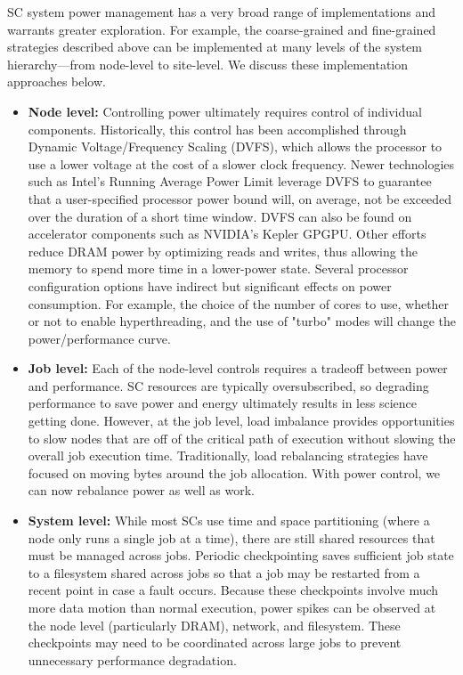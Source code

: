 SC system power management has a very broad range of implementations and warrants greater exploration. For example, the coarse-grained and fine-grained strategies described above can be implemented at many levels of the system hierarchy---from node-level to site-level. We discuss these implementation approaches below.  

\begin{itemize}
\item \textbf{Node level:} Controlling power ultimately requires control of individual
components. Historically, this control has been accomplished through Dynamic Voltage/Frequency Scaling (DVFS), which allows the processor to use a lower voltage at the cost of a slower clock frequency. Newer technologies such as Intel's Running Average Power Limit leverage DVFS to guarantee that a user-specified processor power bound will, on average, not be exceeded over the duration of a short time window. DVFS can also be found on accelerator components such as NVIDIA's Kepler GPGPU. Other efforts reduce DRAM power by optimizing reads and writes, thus allowing the memory to spend more time in a lower-power state. Several processor configuration options have indirect but significant effects on power consumption. For example, the choice of the number of cores to use, whether or not to enable hyperthreading, and the use of "turbo" modes will change the power/performance curve.

\item \textbf{Job level:} Each of the node-level controls requires a tradeoff between
power and performance. SC resources are typically oversubscribed, so degrading performance
to save power and energy ultimately results in less science getting done. However, at the 
job level, load imbalance provides opportunities to slow nodes that are off of the critical
path of execution without slowing the overall job execution time. Traditionally, load 
rebalancing strategies have focused on moving bytes around the job allocation. With 
power control, we can now rebalance power as well as work.

\item \textbf{System level:} While most SCs use time and space partitioning (where a node
only runs a single job at a time), there are still shared resources that must be managed
across jobs. Periodic checkpointing saves sufficient job state to a filesystem shared 
across jobs so that a job may be restarted from a recent point in case a fault occurs.
Because these checkpoints involve much more data motion than normal execution, power 
spikes can be observed at the node level (particularly DRAM), network, and filesystem.
These checkpoints may need to be coordinated across large jobs to prevent unnecessary
performance degradation.


\end{itemize}
